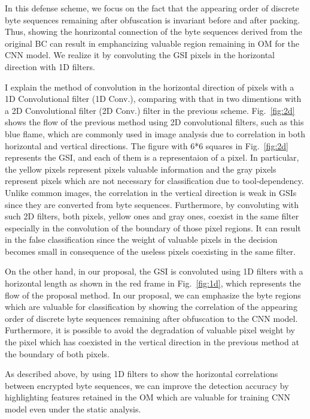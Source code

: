 \documentclass{ieeeaccess}
\newcommand{\myfigurename}{Fig.}
\begin{document}
In this defense scheme, we focus on the fact that the appearing order of discrete byte sequences remaining after obfuscation is invariant before and after packing.
Thus, showing the honrizontal connection of the byte sequences derived from the original BC can result in emphancizing valuable region remaining in OM for the CNN model.
We realize it by convoluting the GSI pixels in the horizontal direction with 1D filters.

I explain the method of convolution in the horizontal direction of pixels with a 1D Convolutional filter (1D Conv.), comparing with that in two dimentions with a 2D Convolutional filter (2D Conv.) filter in the previous scheme.
\myfigurename~\ref{fig:2d} shows the flow of the previous method using 2D convolutional filters, such as this blue flame, which are commonly used in image analysis due to correlation in both horizontal and vertical directions.
The figure with 6*6 squares in \myfigurename~\ref{fig:2d} represents the GSI, and each of them is a representaion of a pixel.
In particular, the yellow pixels represent pixels valuable information and the gray pixels represent pixels which are not necessary for classification due to tool-dependency.
Unlike common images, the correlation in the vertical direction is weak in GSIs since they are converted from byte sequences.
Furthermore, by convoluting with such 2D filters, both pixels, yellow ones and gray ones, coexist in the same filter especially in the convolution of the boundary of those pixel regions.
It can result in the false classification since the weight of valuable pixels in the decision becomes small in consequence of the useless pixels coexisting in the same filter.

On the other hand, in our proposal, the GSI is convoluted using 1D filters with a horizontal length as shown in the red frame in \myfigurename~\ref{fig:1d}, which represents the flow of the proposal method.
In our proposal, we can emphasize the byte regions which are valuable for classification by showing the correlation of the appearing order of discrete byte sequences remaining after obfuscation to the CNN model.
Furthermore, it is possible to avoid the degradation of valuable pixel weight by the pixel which has coexisted in the vertical direction in the previous method at the boundary of both pixels.

As described above, by using 1D filters to show the horizontal correlations between encrypted byte sequences, we can improve the detection accuracy by highlighting features retained in the OM which are valuable for training CNN model even under the static analysis.
\end{document}
